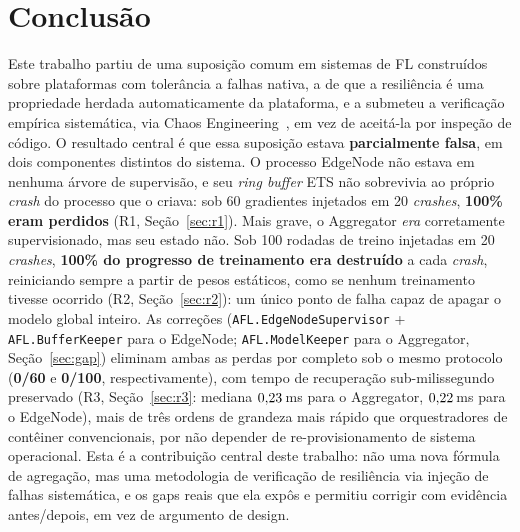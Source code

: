 \documentclass[conference,a4paper]{IEEEtran}
\begin{document}
\section{Conclusão}
\label{sec:conclusion}

Este trabalho partiu de uma suposição comum em sistemas de FL construídos
sobre plataformas com tolerância a falhas nativa, a de que a resiliência é
uma propriedade herdada automaticamente da plataforma, e a submeteu a
verificação empírica sistemática, via Chaos Engineering~\cite{basiri2016},
em vez de aceitá-la por inspeção de código. O resultado central é que essa
suposição estava \textbf{parcialmente falsa}, em dois componentes
distintos do sistema. O processo EdgeNode não estava em nenhuma árvore de
supervisão, e seu \textit{ring buffer} ETS não sobrevivia ao próprio
\textit{crash} do processo que o criava: sob 60 gradientes injetados em
20 \textit{crashes}, \textbf{100\% eram perdidos} (R1, Seção~\ref{sec:r1}).
Mais grave, o Aggregator \emph{era} corretamente supervisionado, mas seu
estado não. Sob 100 rodadas de treino injetadas em 20 \textit{crashes},
\textbf{100\% do progresso de treinamento era destruído} a cada
\textit{crash}, reiniciando sempre a partir de pesos estáticos, como se
nenhum treinamento tivesse ocorrido (R2, Seção~\ref{sec:r2}): um único
ponto de falha capaz de apagar o modelo global inteiro. As correções
(\texttt{AFL.EdgeNodeSupervisor} + \texttt{AFL.BufferKeeper} para o
EdgeNode; \texttt{AFL.ModelKeeper} para o Aggregator, Seção~\ref{sec:gap})
eliminam ambas as perdas por completo sob o mesmo protocolo
(\textbf{0/60} e \textbf{0/100}, respectivamente), com tempo de
recuperação sub-milissegundo preservado (R3, Seção~\ref{sec:r3}: mediana
$0{,}23$\,ms para o Aggregator, $0{,}22$\,ms para o EdgeNode), mais de
três ordens de grandeza mais rápido que orquestradores de contêiner
convencionais, por não depender de re-provisionamento de sistema
operacional. Esta é a contribuição central deste trabalho: não uma nova
fórmula de agregação, mas uma metodologia de verificação de resiliência
via injeção de falhas sistemática, e os gaps reais que ela expôs e
permitiu corrigir com evidência antes/depois, em vez de argumento de
design.
\end{document}
